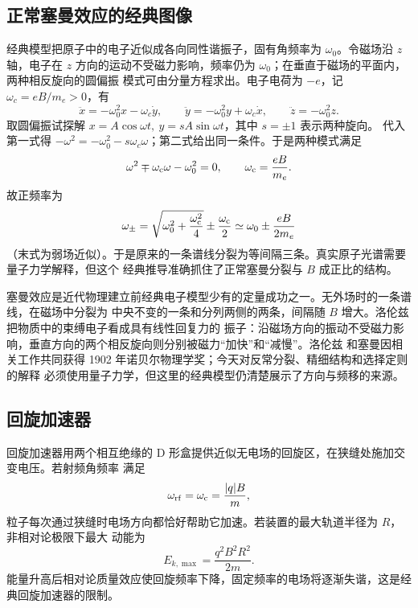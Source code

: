 {\subsection{正常塞曼效应的经典图像}


经典模型把原子中的电子近似成各向同性谐振子，固有角频率为 $\omega_0$。令磁场沿 $z$ 轴，电子在
$z$ 方向的运动不受磁力影响，频率仍为 $\omega_0$；在垂直于磁场的平面内，两种相反旋向的圆偏振
模式可由分量方程求出。电子电荷为 $-e$，记 $\omega_c=eB/m_e>0$，有
\[
 \ddot x=-\omega_0^2x-\omega_c\dot y,\qquad
 \ddot y=-\omega_0^2y+\omega_c\dot x,\qquad
 \ddot z=-\omega_0^2z.
\]
取圆偏振试探解 $x=A\cos\omega t,\ y=sA\sin\omega t$，其中 $s=\pm1$ 表示两种旋向。
代入第一式得 $-\omega^2=-\omega_0^2-s\omega_c\omega$；第二式给出同一条件。于是两种模式满足
\begin{equation}
  \omega^2\mp\omega_{\rm c}\omega-\omega_0^2=0,
  \qquad \omega_{\rm c}=\frac{eB}{m_e}.
\end{equation}
故正频率为
\begin{equation}
  \omega_\pm=\sqrt{\omega_0^2+\frac{\omega_{\rm c}^2}{4}}
  \pm\frac{\omega_{\rm c}}2
  \simeq \omega_0\pm\frac{eB}{2m_e}
\end{equation}
（末式为弱场近似）。于是原来的一条谱线分裂为等间隔三条。真实原子光谱需要量子力学解释，但这个
经典推导准确抓住了正常塞曼分裂与 $B$ 成正比的结构。

塞曼效应是近代物理建立前经典电子模型少有的定量成功之一。无外场时的一条谱线，在磁场中分裂为
中央不变的一条和分列两侧的两条，间隔随 $B$ 增大。洛伦兹把物质中的束缚电子看成具有线性回复力的
振子：沿磁场方向的振动不受磁力影响，垂直方向的两个相反旋向则分别被磁力“加快”和“减慢”。洛伦兹
和塞曼因相关工作共同获得 1902 年诺贝尔物理学奖；今天对反常分裂、精细结构和选择定则的解释
必须使用量子力学，但这里的经典模型仍清楚展示了方向与频移的来源。

\zeemanSpectrumDiagram


\subsection{回旋加速器}


回旋加速器用两个相互绝缘的 D 形盒提供近似无电场的回旋区，在狭缝处施加交变电压。若射频角频率
满足
\begin{equation}
  \omega_{\rm rf}=\omega_{\rm c}=\frac{|q|B}{m},
\end{equation}
粒子每次通过狭缝时电场方向都恰好帮助它加速。若装置的最大轨道半径为 $R$，非相对论极限下最大
动能为
\begin{equation}
  \boxed{E_{k,\max}=\frac{q^2B^2R^2}{2m}}.
\end{equation}
能量升高后相对论质量效应使回旋频率下降，固定频率的电场将逐渐失谐，这是经典回旋加速器的限制。

}
